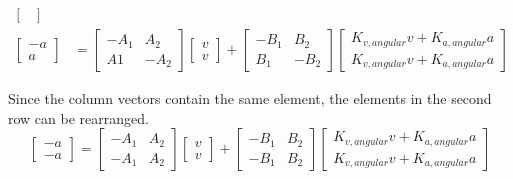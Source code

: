 \begin{align*}
\begin{bmatrix}
    \end{bmatrix} \\
  \begin{bmatrix}
    -a \\
    a
  \end{bmatrix} &=
    \begin{bmatrix}
      -A_1 & A_2 \\
      A1 & -A_2
    \end{bmatrix}
    \begin{bmatrix}
      v \\
      v
    \end{bmatrix} +
    \begin{bmatrix}
      -B_1 & B_2 \\
      B_1 & -B_2
    \end{bmatrix}
    \begin{bmatrix}
      K_{v,angular} v + K_{a,angular} a \\
      K_{v,angular} v + K_{a,angular} a
    \end{bmatrix}
\end{align*}

Since the column vectors contain the same element, the elements in the second
row can be rearranged.
\begin{equation*}
  \begin{bmatrix}
    -a \\
    -a
  \end{bmatrix} =
  \begin{bmatrix}
    -A_1 & A_2 \\
    -A_1 & A_2
  \end{bmatrix}
  \begin{bmatrix}
    v \\
    v
  \end{bmatrix} +
  \begin{bmatrix}
    -B_1 & B_2 \\
    -B_1 & B_2
  \end{bmatrix}
  \begin{bmatrix}
    K_{v,angular} v + K_{a,angular} a \\
    K_{v,angular} v + K_{a,angular} a
  \end{bmatrix}
\end{equation*}

